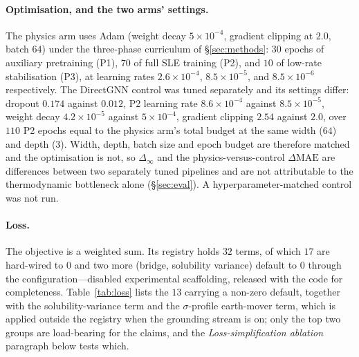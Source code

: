 \paragraph{Optimisation, and the two arms' settings.} The physics arm uses Adam (weight decay
$5\times10^{-4}$, gradient clipping at $2.0$, batch $64$)
under the three-phase curriculum of \S\ref{sec:methods}: $30$ epochs of auxiliary pretraining (P1),
$70$ of full SLE training (P2), and $10$ of low-rate stabilisation (P3), at learning rates
$2.6\times10^{-4}$, $8.5\times10^{-5}$, and $8.5\times10^{-6}$ respectively. The DirectGNN control
was tuned separately and its settings differ: dropout $0.174$ against $0.012$, P2 learning rate
$8.6\times10^{-4}$ against $8.5\times10^{-5}$, weight decay $4.2\times10^{-5}$ against
$5\times10^{-4}$, gradient clipping $2.54$ against $2.0$, over $110$ P2 epochs equal to the physics
arm's total budget at the same width ($64$) and depth ($3$). Width, depth, batch size and epoch
budget are therefore matched and the optimisation is not, so $\Delta_\infty$ and the physics-versus-control
$\Delta\mathrm{MAE}$ are differences between two separately tuned pipelines and are not
attributable to the thermodynamic bottleneck alone (\S\ref{sec:eval}). A
hyperparameter-matched control was not run.
\paragraph{Loss.} The objective is a weighted sum. Its registry holds $32$ terms, of which $17$ are
hard-wired to $0$ and two more (bridge, solubility variance) default to $0$ through the
configuration---disabled experimental scaffolding, released with the code for completeness.
Table~\ref{tab:loss} lists the $13$ carrying a non-zero default, together with the
solubility-variance term and the $\sigma$-profile earth-mover term, which is applied outside the
registry when the grounding stream is on; only the top two groups are load-bearing for the claims, and the
\emph{Loss-simplification ablation} paragraph below tests which.

